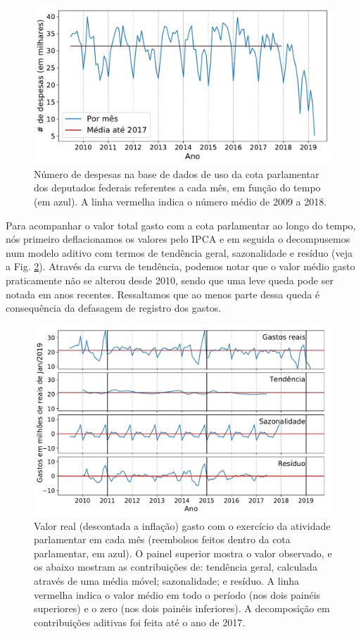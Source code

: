 \documentclass[12pt,a4paper]{article}
\begin{document}
\begin{figure}[H]
\centering
\includegraphics[width=1.0\textwidth]{graficos/n_despesas_por_mes_2019-04-29.pdf}
\caption{Número de despesas na base de dados de uso da cota parlamentar dos deputados federais
  referentes a cada mês, em função do tempo (em azul).
  A linha vermelha indica o número médio de 2009 a 2018.}
\label{fig:n-despesas-por-mes}
\end{figure} 

Para acompanhar o valor total gasto com a cota parlamentar ao longo do tempo, nós primeiro deflacionamos os
valores pelo IPCA e em seguida o decompusemos num modelo aditivo com termos de tendência geral, sazonalidade e
resíduo (veja a Fig. \ref{fig:total-despesas-por-mes}). Através da curva de tendência, podemos notar que
o valor médio gasto praticamente não se alterou desde 2010, sendo que uma leve queda pode ser notada em anos
recentes. Ressaltamos que ao menos parte dessa queda é consequência da defasagem de registro dos gastos.

\begin{figure}[H]
\centering
\includegraphics[width=1.0\textwidth]{graficos/despesas-reais-e-sazonalidade_2019-04-29.pdf}
\caption{Valor real (descontada a inflação) gasto com o exercício da atividade parlamentar em cada mês
  (reembolsos feitos dentro da cota parlamentar, em azul). O painel superior mostra o valor observado, e os
  abaixo mostram as contribuições de: tendência geral, calculada através de uma média móvel; sazonalidade; e resíduo.
  A linha vermelha indica o valor médio em todo o período (nos dois painéis superiores) e o zero (nos dois
  painéis inferiores). A decomposição em contribuições aditivas foi feita até o ano de 2017.}
\label{fig:total-despesas-por-mes}
\end{figure} 
\end{document}
